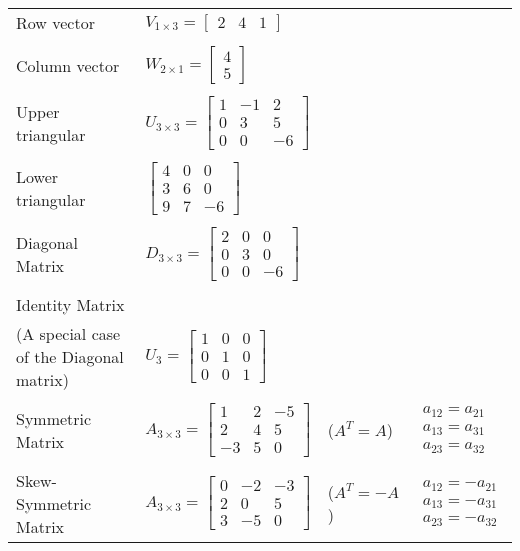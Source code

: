 \documentclass{article}
\begin{document}
\begin{tabular}{Mlll}
    Row vector & $V_{1\times 3}=\begin{bmatrix} 2&4&1 \end{bmatrix}$ \\
    \\
    Column vector & $W_{2\times 1}=\begin{bmatrix}4\\5\end{bmatrix}$\\
    \\
    Upper triangular & $U_{3 \times 3}=\begin{bmatrix} 1&-1&2\\0&3&5\\0&0&-6 \end{bmatrix}$\\
    \\
    Lower triangular & $\begin{bmatrix} 4&0&0\\3&6&0\\9&7&-6 \end{bmatrix} $\\
    \\
    Diagonal Matrix & $D_{3\times 3}=\begin{bmatrix} 2&0&0\\0&3&0\\0&0&-6 \end{bmatrix} $\\
    \\
    Identity Matrix\\(A special case of the Diagonal matrix) & $U_3=\begin{bmatrix} 1&0&0\\0&1&0\\0&0&1 \end{bmatrix} $\\
    \\
    Symmetric Matrix & $A_{3\times 3}=\begin{bmatrix}1&2&-5\\2&4&5\\-3&5&0\end{bmatrix}$ & ($A^T=A$) &
    $\begin{array} {ccc} a_{12}=a_{21}\\ a_{13}=a_{31}\\ a_{23}=a_{32}\end{array}$
    \\
    \\
    Skew-Symmetric Matrix & $A_{3\times 3}=\begin{bmatrix}0&-2&-3\\2&0&5\\3&-5&0\end{bmatrix}$ & ($A^T=-A$) & 
    $\begin{array} {ccc} a_{12}=-a_{21}\\ a_{13}=-a_{31}\\ a_{23}=-a_{32}\end{array}$
\end{tabular}
\end{document}
